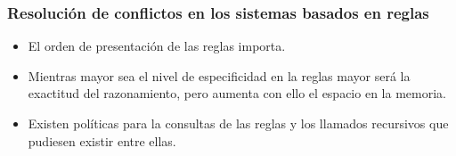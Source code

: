 \documentclass[
10pt, %
aspectratio=169, %
]{beamer}
\begin{document}
	\begin{frame}
		
		\frametitle{Resolución de conflictos en los sistemas basados en reglas}
		
		\begin{itemize}
			\item El orden de presentación de las reglas importa.
			
			\vspace{1\baselineskip}
			\item Mientras mayor sea el nivel de especificidad en la reglas mayor será la exactitud del razonamiento, pero aumenta con ello el espacio en la memoria.
			
			\vspace{1\baselineskip}
			\item Existen políticas para la consultas de las reglas y los llamados recursivos que pudiesen existir entre ellas.
			
		\end{itemize}
	
	\end{frame}
	
\end{document}
